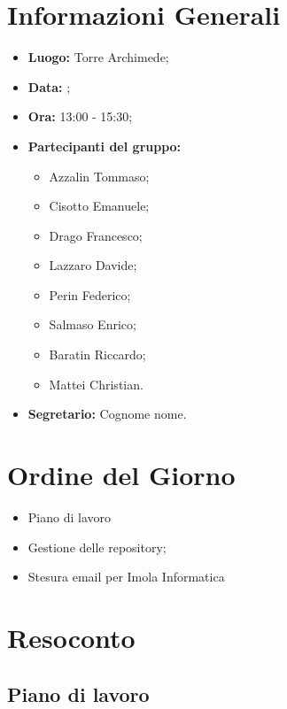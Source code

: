 \documentclass[a4paper, oneside, dvipsnames, table]{article}
\begin{document}
\copertina{}
\newpage



\clearpage
\tableofcontents
\clearpage



\section{Informazioni Generali}
\begin{itemize}
\item \textbf{Luogo:} Torre Archimede;
\item \textbf{Data:} \Data;
\item \textbf{Ora:} 13:00 - 15:30;
\item \textbf{Partecipanti del gruppo:}
	\begin{itemize}
	\item Azzalin Tommaso; 
	\item Cisotto Emanuele; 
	\item Drago Francesco;
	\item Lazzaro Davide;
	\item Perin Federico;
	\item Salmaso Enrico;
	\item Baratin Riccardo;
	\item Mattei Christian.
	\end{itemize} 
\item \textbf{Segretario:} Cognome nome.
\end{itemize}

\clearpage

\section{Ordine del Giorno}
\begin{itemize}
\item Piano di lavoro
\item Gestione delle repository;
\item Stesura email per Imola Informatica
\end{itemize}

\clearpage

\section{Resoconto}
\subsection{Piano di lavoro}
\end{document}
